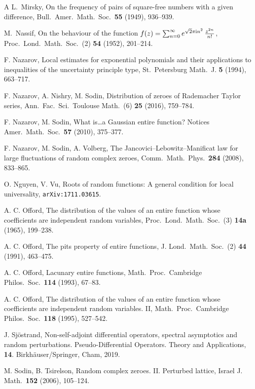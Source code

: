 \documentclass[11pt]{amsart}
\numberwithin{equation}{section}
\begin{document}
\begin{thebibliography}{A}
 L.~Mirsky,
On the frequency of pairs of square-free numbers with a given difference,
Bull.\ Amer.\ Math.\ Soc.\ {\bf 55} (1949), 936--939.

 M.~Nassif,
On the behaviour of the function $ f(z)=\sum_{n=0}^\infty e^{\sqrt2\pi{\rm i} n^2}\, \frac{z^{2n}}{n!}$, 
Proc.\ Lond.\ Math.\ Soc.\ (2) {\bf 54} (1952), 201--214.

 F. Nazarov,
Local estimates for exponential polynomials and their applications to inequalities of the uncertainty principle type, St.\ Petersburg Math.\  J. {\bf 5} (1994), 663--717.

 F. Nazarov, A. Nishry, M. Sodin,
Distribution of zeroes of Rademacher Taylor series, 
Ann.\ Fac.\ Sci.\ Toulouse Math.\ (6) {\bf 25} (2016), 759--784.

 F. Nazarov, M. Sodin,
What is…a Gaussian entire function? Notices Amer.\ Math.\ Soc.\ {\bf 57} (2010),
375--377.

 F. Nazarov, M. Sodin, A. Volberg,
The Jancovici--Lebowitz--Manificat law for large fluctuations of random complex zeroes, 
Comm.\ Math.\ Phys.\ {\bf 284} (2008), 833--865.

 O. Nguyen, V. Vu,
Roots of random functions: A general condition for local universality, {\tt arXiv:1711.03615}.

 A. C. Offord,
 The distribution of the values of an entire function whose coefficients are independent random variables, Proc.\ Lond.\ Math.\ Soc.\ (3) {\bf 14a} (1965), 199--238.

 A. C. Offord,
The pits property of entire functions, J. Lond.\ Math.\ Soc.\ (2) {\bf 44} (1991), 463--475.

 A. C. Offord,
Lacunary entire functions, Math.\ Proc.\ Cambridge Philos.\ Soc.\ {\bf 114} (1993), 67--83.

 A. C. Offord,
The distribution of the values of an entire function whose coefficients are independent random variables. II, Math.\ Proc.\ Cambridge Philos.\ Soc.\ {\bf 118} (1995), 527--542.

 J. Sj\"ostrand,
Non-self-adjoint differential operators, spectral asymptotics and random perturbations. Pseudo-Differential Operators. Theory and Applications, {\bf 14}. Birkh\"auser/Springer, Cham, 2019.

 M. Sodin, B. Tsirelson,
Random complex zeroes. II. Perturbed lattice, Israel J. Math.\ {\bf 152} (2006), 105--124.


\end{thebibliography}
\end{document}
